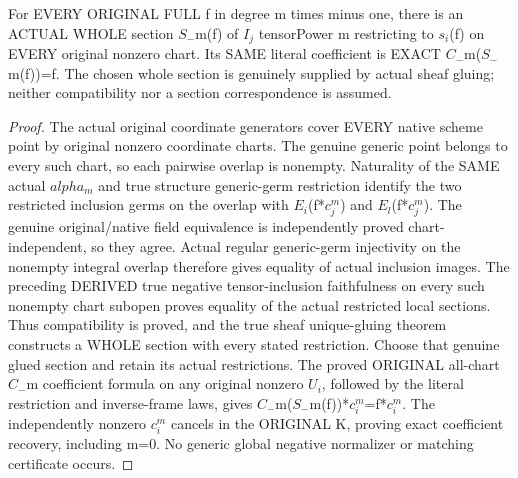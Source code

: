 \begin{theorem}
\label{thm:seven-native-negative-tensor-original-whole-sections}
\leanok
For EVERY ORIGINAL FULL f in degree m times minus one, there is an
ACTUAL WHOLE section $S_-$m(f) of $I_j$ tensorPower m restricting to $s_i$(f)
on EVERY original nonzero chart. Its SAME literal coefficient is EXACT
$C_-$m($S_-$m(f))=f. The chosen whole section is genuinely supplied by
actual sheaf gluing; neither compatibility nor a section correspondence
is assumed.
\end{theorem}
\begin{proof}
The actual original coordinate generators cover EVERY native scheme
point by original nonzero coordinate charts. The genuine generic point
belongs to every such chart, so each pairwise overlap is nonempty.
Naturality of the SAME actual $alpha_m$ and true structure generic-germ
restriction identify the two restricted inclusion germs on the overlap
with $E_i$(f*$c_j^m$) and $E_l$(f*$c_j^m$). The genuine original/native field
equivalence is independently proved chart-independent, so they agree.
Actual regular generic-germ injectivity on the nonempty integral overlap
therefore gives equality of actual inclusion images. The preceding
DERIVED true negative tensor-inclusion faithfulness on every such
nonempty chart subopen proves equality of the actual restricted local
sections. Thus compatibility is proved, and the true sheaf unique-gluing
theorem constructs a WHOLE section with every stated restriction.
Choose that genuine glued section and retain its actual restrictions.
The proved ORIGINAL all-chart $C_-$m coefficient formula on any original
nonzero $U_i$, followed by the literal restriction and inverse-frame laws,
gives $C_-$m($S_-$m(f))*$c_i^m$=f*$c_i^m$. The independently nonzero $c_i^m$
cancels in the ORIGINAL K, proving exact coefficient recovery, including
m=0. No generic global negative normalizer or matching certificate occurs.
\end{proof}

